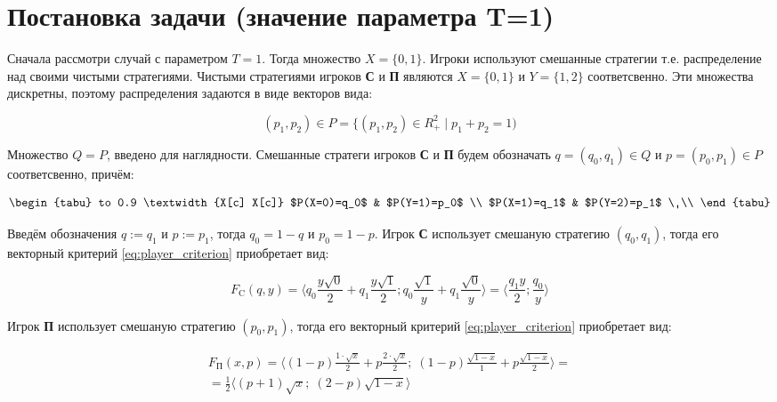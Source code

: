 \section{Постановка задачи (значение параметра T=1)}

Сначала рассмотри случай с параметром $T=1$. Тогда множество $X=\{0, 1\}$.
Игроки используют смешанные стратегии т.е. распределение над своими чистыми стратегиями.
Чистыми стратегиями игроков \textbf{С} и \textbf{П} являются $X=\{0, 1\}$ и $Y=\{1,2\}$ 
соответсвенно. Эти множества дискретны, поэтому распределения задаются в виде векторов 
вида: 

$$(p_1, p_2) \in P = \{(p_1, p_2) \in R_+^2 \; | \; p_1 + p_2 = 1)$$

Множество $Q=P$, введено для наглядности. 
Смешанные стратеги игроков \textbf{С} и \textbf{П} будем обозначать
$q=(q_0,q_1) \in Q$ и $p=(p_0,p_1) \in P$ соответсвенно, причём:

\begin{equation}
\begin{tabu} to 0.9 \textwidth {X[c] X[c]}
	$P(X=0)=q_0$ & $P(Y=1)=p_0$ \\
	$P(X=1)=q_1$ & $P(Y=2)=p_1$ \
	\\
	\end{tabu}	
\label{eq:probability_1}
\end{equation}

Введём обозначения $q := q_1$ и $p := p_1$, тогда $q_0 = 1-q$ и $p_0 = 1 - p$. 
Игрок \textbf{С} использует смешаную стратегию  $(q_0,q_1)$, тогда
его векторный критерий \eqref{eq:player_criterion} приобретает вид: 

$$
	F_\textrm{C}(q,y)=
	\big \langle
		q_0\frac{y\sqrt{0}}{2} + 
		q_1\frac{y\sqrt{1}}{2};
		q_0\frac{\sqrt{1}}{y} +
		q_1\frac{\sqrt{0}}{y}
	\big \rangle 
	= 	
	\big \langle
		\frac{q_1y}{2};
		\frac{q_0}{y}
	\big \rangle 
$$

Игрок \textbf{П} использует смешаную стратегию  $(p_0,p_1)$, тогда
его векторный критерий \eqref{eq:player_criterion} приобретает вид: 

\begin{gather*}
	F_\textrm{П}(x,p)=
	\big \langle 
		(1-p)\frac{1 \cdot \sqrt{x}}{2} + p \frac{2 \cdot \sqrt{x}}{2}; \;
		(1-p)\frac{\sqrt{1-x}}{1}+p\frac{\sqrt{1-x}}{2} 
	\big \rangle=
	\\
	=\frac{1}{2}
	\big \langle
		(p+1)\sqrt{x}; \;
		(2-p)\sqrt{1-x}
	\big \rangle
\end{gather*}
	
\vspace{5mm}


